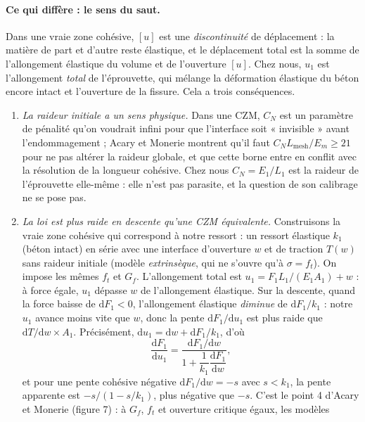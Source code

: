 \documentclass[11pt,a4paper]{article}
\newcommand{\dd}{\mathrm{d}}
\begin{document}
\paragraph{Ce qui diffère : le sens du saut.} Dans une vraie zone cohésive, $[u]$ est une
\emph{discontinuité} de déplacement : la matière de part et d'autre reste élastique, et le
déplacement total est la somme de l'allongement élastique du volume et de l'ouverture $[u]$.
Chez nous, $u_1$ est l'allongement \emph{total} de l'éprouvette, qui mélange la déformation
élastique du béton encore intact et l'ouverture de la fissure. Cela a trois conséquences.
\begin{enumerate}[nosep]
  \item \emph{La raideur initiale a un sens physique.} Dans une CZM, $C_N$ est un paramètre de
        pénalité qu'on voudrait infini pour que l'interface soit « invisible » avant
        l'endommagement ; Acary et Monerie montrent qu'il faut $C_NL_{\text{mesh}}/E_m \ge 21$ pour
        ne pas altérer la raideur globale, et que cette borne entre en conflit avec la
        résolution de la longueur cohésive. Chez nous $C_N = E_1/L_1$ est la raideur de
        l'éprouvette elle-même : elle n'est pas parasite, et la question de son calibrage ne se
        pose pas.
  \item \emph{La loi est plus raide en descente qu'une CZM équivalente.} Construisons la vraie
        zone cohésive qui correspond à notre ressort : un ressort élastique $k_1$ (béton intact)
        en série avec une interface d'ouverture $w$ et de traction $T(w)$ sans raideur initiale
        (modèle \emph{extrinsèque}, qui ne s'ouvre qu'à $\sigma = f_t$). On impose les mêmes
        $f_t$ et $G_f$. L'allongement total est $u_1 = F_1L_1/(E_1A_1) + w$ : à force égale,
        $u_1$ dépasse $w$ de l'allongement élastique. Sur la descente, quand la force baisse de
        $\dd F_1 < 0$, l'allongement élastique \emph{diminue} de $\dd F_1/k_1$ : notre $u_1$
        avance moins vite que $w$, donc la pente $\dd F_1/\dd u_1$ est plus raide que
        $\dd T/\dd w\times A_1$. Précisément, $\dd u_1 = \dd w + \dd F_1/k_1$, d'où
        \begin{equation}
          \frac{\dd F_1}{\dd u_1} = \frac{\dd F_1/\dd w}{1 + \dfrac{1}{k_1}\dfrac{\dd F_1}{\dd w}} ,
        \end{equation}
        et pour une pente cohésive négative $\dd F_1/\dd w = -s$ avec $s < k_1$, la pente
        apparente est $-s/(1-s/k_1)$, plus négative que $-s$. C'est le point 4 d'Acary et
        Monerie (figure 7) : à $G_f$, $f_t$ et ouverture critique égaux, les modèles

\end{enumerate}
\end{document}
